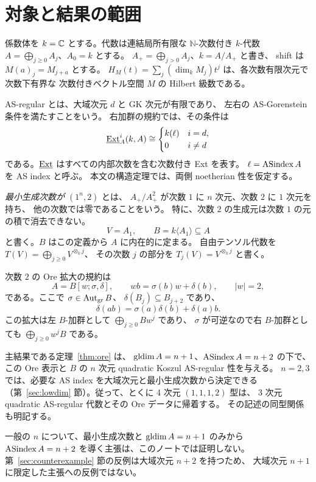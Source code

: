 \section{対象と結果の範囲}\label{sec:conventions}

係数体を \(k=\mathbb C\) とする。代数は連結局所有限な
\(\mathbb N\)-次数付き \(k\)-代数
\(A=\bigoplus_{j\ge0}A_j\)、\(A_0=k\) とする。
\(A_+=\bigoplus_{j>0}A_j\)、\(k=A/A_+\) と書き、
shift は \(M(a)_j=M_{j+a}\) とする。
\(H_M(t)=\sum_j(\dim_kM_j)t^j\) は、各次数有限次元で次数下有界な
次数付きベクトル空間 \(M\) の Hilbert 級数である。

AS-regular とは、大域次元 \(d\) と GK 次元が有限であり、
左右の AS-Gorenstein 条件を満たすことをいう。
右加群の規約では、その条件は
\[
\underline{\operatorname{Ext}}^{i}_A(k,A)\cong
\begin{cases}k(\ell)&i=d,\\0&i\ne d\end{cases}
\]
である。\(\underline{\operatorname{Ext}}\) はすべての内部次数を含む次数付き Ext を表す。
\(\ell=\operatorname{ASindex} A\) を AS index と呼ぶ。
本文の構造定理では、両側 noetherian 性を仮定する。

\emph{最小生成次数が \((1^n,2)\)} とは、
\(A_+/A_+^2\) が次数 \(1\) に \(n\) 次元、次数 \(2\) に \(1\) 次元を持ち、
他の次数では零であることをいう。
特に、次数 \(2\) の生成元は次数 \(1\) の元の積で消去できない。
\[
V=A_1,\qquad B=k\langle A_1\rangle\subseteq A
\]
と書く。\(B\) はこの定義から \(A\) に内在的に定まる。
自由テンソル代数を \(T(V)=\bigoplus_{j\ge0}V^{\otimes_k j}\)、
その次数 \(j\) の部分を \(T_j(V)=V^{\otimes_k j}\) と書く。

次数 \(2\) の Ore 拡大の規約は
\[
A=B[w;\sigma,\delta],\qquad
wb=\sigma(b)w+\delta(b),\qquad |w|=2,
\]
である。ここで \(\sigma\in\operatorname{Aut}_{\mathrm{gr}}B\)、
\(\delta(B_j)\subseteq B_{j+2}\) であり、
\[
\delta(ab)=\sigma(a)\delta(b)+\delta(a)b.
\]
この拡大は左 \(B\)-加群として \(\bigoplus_{j\ge0}Bw^j\) であり、
\(\sigma\) が可逆なので右 \(B\)-加群としても
\(\bigoplus_{j\ge0}w^jB\) である。

主結果である定理~\ref{thm:ore} は、
\(\operatorname{gldim} A=n+1\)、\(\operatorname{ASindex} A=n+2\) の下で、この Ore 表示と
\(B\) の \(n\) 次元 quadratic Koszul AS-regular 性を与える。
\(n=2,3\) では、必要な AS index を大域次元と最小生成次数から決定できる
（第~\ref{sec:lowdim} 節）。従って、とくに 4 次元 \((1,1,1,2)\) 型は、
3 次元 quadratic AS-regular 代数とその Ore データに帰着する。
その記述の同型関係も明記する。

一般の \(n\) について、最小生成次数と \(\operatorname{gldim} A=n+1\) のみから
\(\operatorname{ASindex} A=n+2\) を導く主張は、このノートでは証明しない。
第~\ref{sec:counterexample} 節の反例は大域次元 \(n+2\) を持つため、
大域次元 \(n+1\) に限定した主張への反例ではない。
